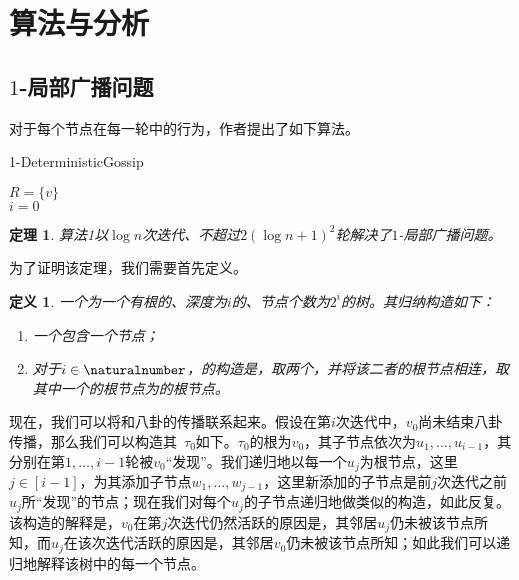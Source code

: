 \documentclass[12pt]{article}
\newtheorem{theorem}{定理}[section]
\newtheorem{definition}{定义}[section]
\begin{document}
\section{算法与分析}
\subsection{$1$-局部广播问题}
对于每个节点在每一轮中的行为，作者提出了如下算法。

\begin{algorithm}[H]
  \caption{1-DeterministicGossip}
  \SetAlgoNoLine
  $R=\{v\}$\\
  $i=0$\\
\end{algorithm}

\begin{theorem}
  \rm{算法1}以$\log n$次迭代、不超过$2(\log n + 1)^2$轮解决了$1$-局部广播问题。
\end{theorem}
为了证明该定理，我们需要首先定义\itree 。
\begin{definition}
  一个\itree 为一个有根的、深度为$i$的、节点个数为$2^i$的树。其归纳构造如下：
  \begin{enumerate}
    \item 一个\itree[0]包含一个节点；
    \item 对于$i\in\naturalnumber$，\itree[(i+1)]的构造是，取两个\itree ，并将该二者的根节点相连，取其中一个的根节点为\itree[(i+1)]的根节点。
  \end{enumerate}
\end{definition}
现在，我们可以将\itree 和八卦的传播联系起来。假设在第$i$次迭代中，$v_0$尚未结束八卦传播，那么我们可以构造其\itree\ $\tau_0$如下。$\tau_0$的根为$v_0$，其子节点依次为$u_1, \dots, u_{i-1}$，其分别在第$1, \dots, i-1$轮被$v_0$“发现”。我们递归地以每一个$u_j$为根节点，这里$j\in[i-1]$，为其添加子节点$w_1, \dots, w_{j-1}$，这里新添加的子节点是前$j$次迭代之前$u_j$所“发现”的节点；现在我们对每个$u_j$的子节点递归地做类似的构造，如此反复。该构造的解释是，$v_0$在第$j$次迭代仍然活跃的原因是，其邻居$u_j$仍未被该节点所知，而$u_j$在该次迭代活跃的原因是，其邻居$v_0$仍未被该节点所知；如此我们可以递归地解释该树中的每一个节点。
\end{document}
